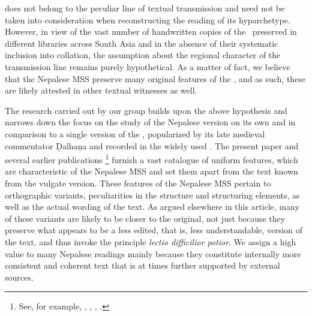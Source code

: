does not belong to the peculiar line of textual transmission and need not be taken into consideration when reconstructing the reading of its hyparchetype. However, in view of the vast number of handwritten copies of the \SS\ preserved in different libraries across South Asia and in the absence of their systematic inclusion into collation, the assumption about the regional character of the transmission line remains purely hypothetical. As a matter of fact, we believe that the Nepalese MSS preserve many original features of the \SS, and as such, these are likely attested in other textual witnesses as well.

The research carried out by our group builds upon the above hypothesis and narrows down the focus on the study of the Nepalese version on its own and in comparison to a single version of the \SS, popularized by its late medieval commentator Ḍalhaṇa and recorded in the widely used \citet{vulgate}. 
The present paper and several earlier publications%
    \footnote{%
    See, for example, \citet{hari-2011}, \citet{wuja-2013}, \citet{birc-2021}, \citet{birc-2021a}.%
    } 
furnish a vast catalogue of uniform features, which are characteristic of the Nepalese MSS and set them apart from the text known from the vulgate version. These features of the Nepalese MSS pertain to orthographic variants, peculiarities in the structure and structuring elements, as well as the actual wording of the text. As argued elsewhere in this article, many of these variants are likely to be closer to the original, not just because they preserve what appears to be a less edited, that is, less understandable, version of the text, and thus invoke the principle \emph{lectio difficilior potior}. We assign a high value to many Nepalese readings mainly because they constitute internally more consistent and coherent text that is at times further supported by external sources.
 
